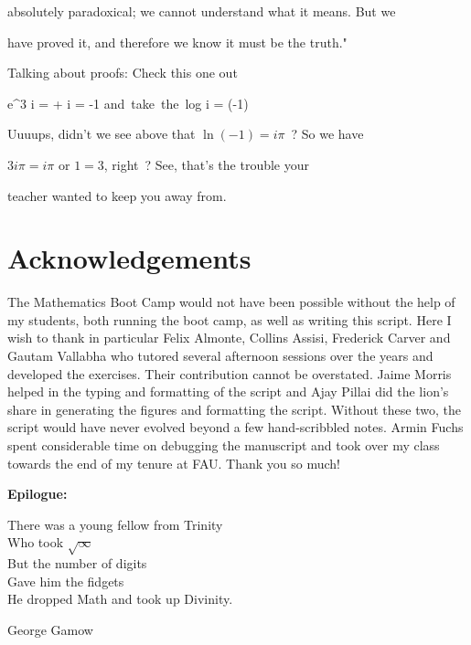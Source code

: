 absolutely paradoxical; we cannot understand what it means. But we

have proved it, and therefore we know it must be the truth."



Talking about proofs: Check this one out

\bnn
   e^{3 i \pi} = \pi + i  \pi = -1 \quad \mbox{and take the log}
       i \pi = \ln (-1)
\enn



Uuuups, didn't we see above that $\ln (-1) = i \pi$~? So we have

$3 i \pi = i \pi$ or $1=3$, right~? See, that's the trouble your

teacher wanted to keep you away from.







\section{Acknowledgements}



The Mathematics Boot Camp would not have been possible without the
help of my students, both running the boot camp, as well as
writing this script. Here I wish to thank in particular Felix
Almonte, Collins Assisi, Frederick Carver and Gautam Vallabha who
tutored several afternoon sessions over the years and developed
the exercises. Their contribution cannot be overstated. Jaime
Morris helped in the typing and formatting of the script and Ajay
Pillai did the lion's share in generating the figures and
formatting the script. Without these two, the script would have
never evolved beyond a few hand-scribbled notes. Armin Fuchs spent considerable time on debugging the manuscript and took over my class towards the end of my tenure at FAU. Thank you so much!
\vs \vs







{\bf \large Epilogue:}


\large

There was a young fellow from Trinity \\
Who took $\sqrt{\infty}$ \\
But the number of digits \\
Gave him the fidgets \\
He dropped  Math and took up Divinity.

\hspace*{4cm} George Gamow 














